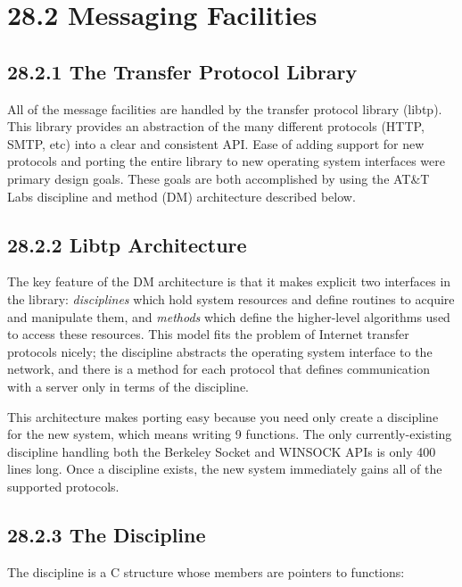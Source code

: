 \section[28.2 Messaging Facilities]{28.2 Messaging Facilities}
\subsection[28.2.1 The Transfer Protocol Library]{28.2.1 The Transfer
Protocol Library}

All of the message facilities are handled by the transfer protocol
library (libtp). This library provides an abstraction of the many
different protocols (HTTP, SMTP, etc) into a clear and consistent
API. Ease of adding support for new protocols and porting the entire
library to new operating system interfaces were primary design
goals. These goals are both accomplished by using the AT\&T Labs
discipline and method (DM) architecture described below.

\subsection[28.2.2 Libtp Architecture]{28.2.2 Libtp Architecture}

The key feature of the DM architecture is that it makes explicit two
interfaces in the library: \textit{disciplines} which hold system
resources and define routines to acquire and manipulate them, and
\textit{methods} which define the higher-level algorithms used to
access these resources. This model fits the problem of Internet
transfer protocols nicely; the discipline abstracts the operating
system interface to the network, and there is a method for each
protocol that defines communication with a server only in terms of the
discipline.

This architecture makes porting easy because you need only create a
discipline for the new system, which means writing 9 functions. The
only currently-existing discipline handling both the Berkeley Socket
and WINSOCK APIs is only 400 lines long. Once a discipline exists, the
new system immediately gains all of the supported protocols.

\subsection[28.2.3 The Discipline]{28.2.3 The Discipline}

The discipline is a C structure whose members are pointers to functions:

